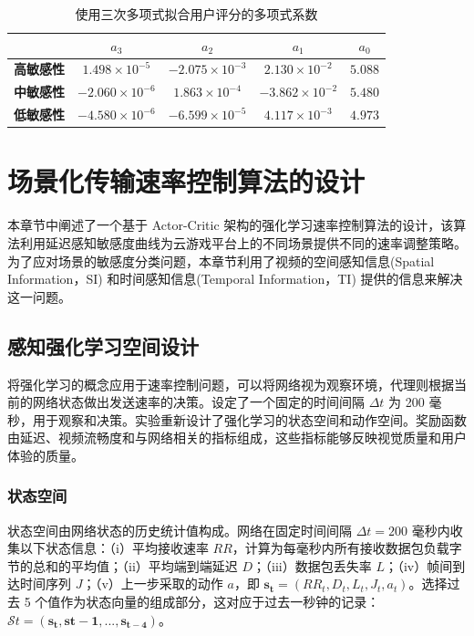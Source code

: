 \begin{table}[ht]
\caption{使用三次多项式拟合用户评分的多项式系数}
\renewcommand\arraystretch{1.25}
\centering
\begin{tabular}{@{}ccccc@{}}
\toprule
\textbf{}                              & \textbf{$a_3$}          & \textbf{$a_2$}          & \textbf{$a_1$}         & \textbf{$a_0$} \\ \midrule
\multicolumn{1}{c|}{\textbf{高敏感性}}  & $1.498 \times 10^{-5}$   & $-2.075 \times 10^{-3}$   & $2.130 \times 10^{-2}$  & $5.088$        \\

\multicolumn{1}{c|}{\textbf{中敏感性}} & $- 2.060 \times 10^{-6}$ & $1.863 \times 10^{-4}$   & $-3.862 \times 10^{-2}$ & $5.480$        \\
\multicolumn{1}{c|}{\textbf{低敏感性}}  & $- 4.580 \times 10^{-6}$ & $- 6.599 \times 10^{-5}$ & $4.117 \times 10^{-3}$  & $4.973$        \\ \bottomrule
\end{tabular}
\label{tab:a3a2a1a0}
\end{table}


\section{场景化传输速率控制算法的设计}
本章节中阐述了一个基于 Actor-Critic 架构的强化学习速率控制算法的设计，该算法利用延迟感知敏感度曲线为云游戏平台上的不同场景提供不同的速率调整策略。为了应对场景的敏感度分类问题，本章节利用了视频的空间感知信息(Spatial Information，SI) 和时间感知信息(Temporal Information，TI) 提供的信息来解决这一问题。

\subsection{感知强化学习空间设计}\label{sec:rl-design}
将强化学习的概念应用于速率控制问题，可以将网络视为观察环境，代理则根据当前的网络状态做出发送速率的决策。设定了一个固定的时间间隔 $\Delta t$ 为 200 毫秒，用于观察和决策。实验重新设计了强化学习的状态空间和动作空间。奖励函数由延迟、视频流畅度和与网络相关的指标组成，这些指标能够反映视觉质量和用户体验的质量。

\subsubsection{状态空间}
状态空间由网络状态的历史统计值构成。网络在固定时间间隔 $\Delta t = 200$ 毫秒内收集以下状态信息：（i）平均接收速率 $RR$，计算为每毫秒内所有接收数据包负载字节的总和的平均值；（ii）平均端到端延迟 $D$；（iii）数据包丢失率 $L$；（iv）帧间到达时间序列 $J$；（v）上一步采取的动作 $a$，即 $\boldsymbol{s_t} = (RR_t, D_t, L_t, J_t, a_t)$。选择过去 5 个值作为状态向量的组成部分，这对应于过去一秒钟的记录：$\mathcal{S}t = (\boldsymbol{s_t}, \boldsymbol{s{t-1}}, ..., \boldsymbol{s_{t-4}})$。


